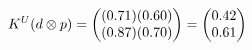 \documentclass[preview]{standalone}
\begin{document}
\begin{align*}
\special{dvisvgm:raw <g id='unique000'>}K^U(d \otimes p) = \begin{pmatrix} (0.71)(0.60) \\ (0.87)(0.70) \end{pmatrix} = \begin{pmatrix} 0.42 \\ 0.61 \end{pmatrix}\special{dvisvgm:raw </g>}
\end{align*}
\end{document}
